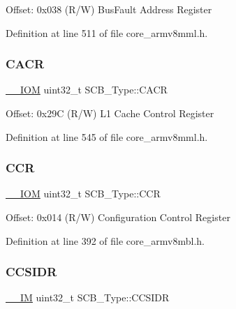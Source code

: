 Offset\+: 0x038 (R/W) Bus\+Fault Address Register 

Definition at line 511 of file core\+\_\+armv8mml.\+h.

\mbox{\label{struct_s_c_b___type_a51f9bd107a4e1d46ba647384e5c825b5}} 
\subsubsection{\texorpdfstring{C\+A\+CR}{CACR}}
{\footnotesize\ttfamily \hyperlink{core__sc300_8h_ab6caba5853a60a17e8e04499b52bf691}{\+\_\+\+\_\+\+I\+OM} uint32\+\_\+t S\+C\+B\+\_\+\+Type\+::\+C\+A\+CR}

Offset\+: 0x29C (R/W) L1 Cache Control Register 

Definition at line 545 of file core\+\_\+armv8mml.\+h.

\mbox{\label{struct_s_c_b___type_a2d6653b0b70faac936046a02809b577f}} 
\subsubsection{\texorpdfstring{C\+CR}{CCR}}
{\footnotesize\ttfamily \hyperlink{core__sc300_8h_ab6caba5853a60a17e8e04499b52bf691}{\+\_\+\+\_\+\+I\+OM} uint32\+\_\+t S\+C\+B\+\_\+\+Type\+::\+C\+CR}

Offset\+: 0x014 (R/W) Configuration Control Register 

Definition at line 392 of file core\+\_\+armv8mbl.\+h.

\mbox{\label{struct_s_c_b___type_afd063c9297a1a3b67e6d1d5e179e6a0e}} 
\subsubsection{\texorpdfstring{C\+C\+S\+I\+DR}{CCSIDR}}
{\footnotesize\ttfamily \hyperlink{core__sc300_8h_a4cc1649793116d7c2d8afce7a4ffce43}{\+\_\+\+\_\+\+IM} uint32\+\_\+t S\+C\+B\+\_\+\+Type\+::\+C\+C\+S\+I\+DR}

